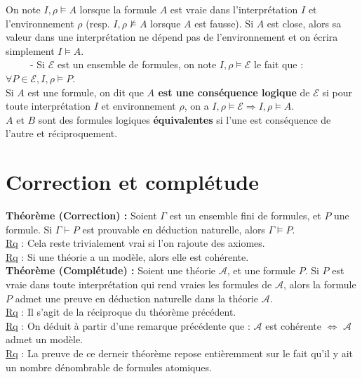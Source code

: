 \documentclass[11pt,a4paper]{article}
\begin{document}
On note $I,\rho	\models A$ lorsque la formule $A$ est vraie dans l'interprétation $I$ et l'environnement $\rho$ (resp.  $I,\rho \not\models A$ lorsque $A$ est fausse). Si $A$ est close, alors sa valeur dans une interprétation ne dépend pas de l’environnement et on écrira simplement $I \models A$. \\

\ \ \ \ \ - Si $\mathcal{E}$ est un ensemble de formules, on note $I,\rho \models \mathcal{E}$ le fait que : $\forall P \in \mathcal{E}, I,\rho \models P$. \\
Si $A$ est une formule, on dit que \textbf{$A$ est une conséquence logique} de $\mathcal{E}$ si pour toute interprétation $I$ et environnement $\rho$, on a $I, \rho \models \mathcal{E} \Rightarrow I,\rho \models A$. \\
$A$ et $B$ sont des formules logiques \textbf{équivalentes} si l'une est conséquence de l'autre et réciproquement. \\

\section{Correction et complétude}

\textbf{Théorème (Correction) : }Soient $\Gamma$ est un ensemble fini de formules, et $P$ une formule. Si $ \Gamma \vdash P$ est prouvable en déduction naturelle, alors $\Gamma \models P$. \\

\underline{Rq} : Cela reste trivialement vrai si l'on rajoute des axiomes. \\
\underline{Rq} : Si une théorie a un modèle, alors elle est cohérente. \\

\textbf{Théorème (Complétude) : }Soient une théorie $\mathcal{A}$, et une formule $P$. Si $P$ est vraie dans toute interprétation qui rend vraies les formules de $\mathcal{A}$, alors la formule $P$ 	admet une preuve en déduction naturelle dans la théorie $\mathcal{A}$. \\

\underline{Rq} : Il s'agit de la réciproque du théorème précédent. \\
\underline{Rq} : On déduit à partir d'une remarque précédente que : $\mathcal{A}$ est cohérente $\Leftrightarrow$ $\mathcal{A}$ admet un modèle. \\
\underline{Rq} : La preuve de ce derneir théorème repose entièremment sur le fait qu'il y ait un nombre dénombrable de formules atomiques.\\
\end{document}
